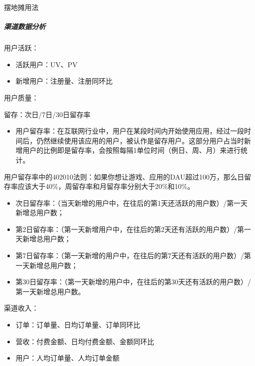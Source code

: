 \documentclass[letterpaper,11pt,english]{sphinxmanual}
\begin{document}
\begin{center}\end{center}
摆地摊用法%
\begin{footnote}[577]\sphinxAtStartFootnote
{}
%
\end{footnote}


\subparagraph{渠道数据分析}
\label{\detokenize{chapter_knowledge/data_analysis:id11}}
用户活跃：
\begin{itemize}
\item {} 
活跃用户：UV、PV

\item {} 
新增用户：注册量、注册同环比

\end{itemize}

用户质量：

留存：次日/7日/30日留存率
\begin{itemize}
\item {} 
用户留存率：在互联网行业中，用户在某段时间内开始使用应用，经过一段时间后，仍然继续使用该应用的用户，被认作是留存用户。这部分用户占当时新增用户的比例即是留存率，会按照每隔1单位时间（例日、周、月）来进行统计。

\end{itemize}

用户留存率中的40\sphinxhyphen{}20\sphinxhyphen{}10法则：如果你想让游戏、应用的DAU超过100万，那么日留存率应该大于40\%，周留存率和月留存率分别大于20\%和10\%。
\begin{itemize}
\item {} 
次日留存率：（当天新增的用户中，在往后的第1天还活跃的用户数）/第一天新增总用户数；

\item {} 
第2日留存率：（第一天新增用户中，在往后的第2天还有活跃的用户数）/第一天新增总用户数；

\item {} 
第7日留存率：（第一天新增的用户中，在往后的第7天还有活跃的用户数）/第一天新增总用户数；

\item {} 
第30日留存率：（第一天新增的用户中，在往后的第30天还有活跃的用户数）/第一天新增总用户数。

\end{itemize}

渠道收入：
\begin{itemize}
\item {} 
订单：订单量、日均订单量、订单同环比

\item {} 
营收：付费金额、日均付费金额、金额同环比

\item {} 
用户：人均订单量、人均订单金额

\end{itemize}
\end{document}
